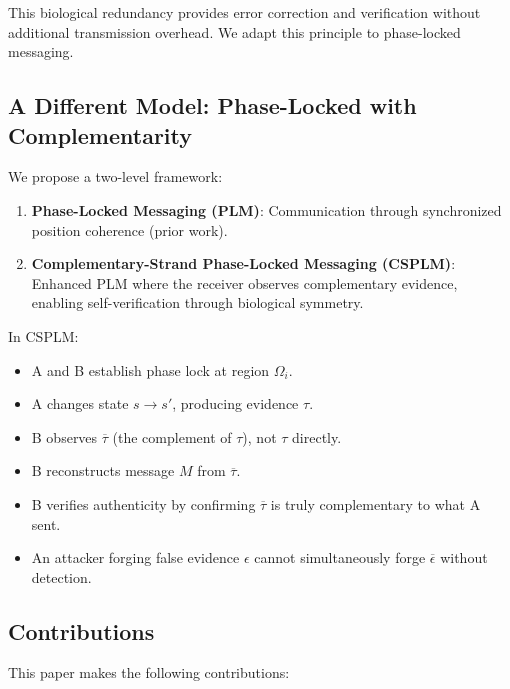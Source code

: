\documentclass[twocolumn,10pt,a4paper]{article}
\theoremstyle{plain}
\theoremstyle{definition}
\newcommand{\comp}[1]{\overline{#1}}
\begin{document}
This biological redundancy provides error correction and verification without additional transmission overhead. We adapt this principle to phase-locked messaging.

\subsection{A Different Model: Phase-Locked with Complementarity}

We propose a two-level framework:

\begin{enumerate}
\item \textbf{Phase-Locked Messaging (PLM)}: Communication through synchronized position coherence (prior work).
\item \textbf{Complementary-Strand Phase-Locked Messaging (CSPLM)}: Enhanced PLM where the receiver observes complementary evidence, enabling self-verification through biological symmetry.
\end{enumerate}

In CSPLM:
\begin{itemize}
\item A and B establish phase lock at region $\Omega_i$.
\item A changes state $s \to s'$, producing evidence $\tau$.
\item B observes $\comp{\tau}$ (the complement of $\tau$), not $\tau$ directly.
\item B reconstructs message $M$ from $\comp{\tau}$.
\item B verifies authenticity by confirming $\comp{\tau}$ is truly complementary to what A sent.
\item An attacker forging false evidence $\epsilon$ cannot simultaneously forge $\comp{\epsilon}$ without detection.
\end{itemize}

\subsection{Contributions}

This paper makes the following contributions:
\end{document}
